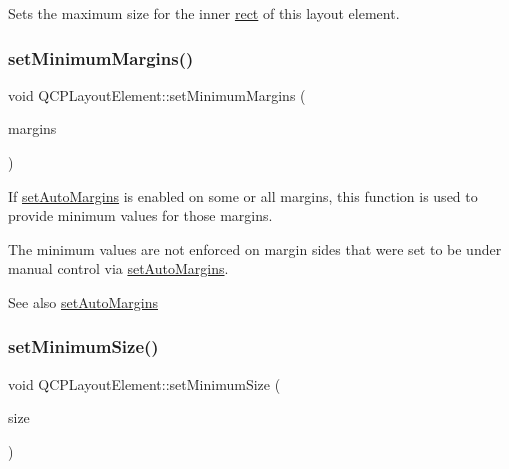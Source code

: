 Sets the maximum size for the inner \mbox{\hyperlink{class_q_c_p_layout_element_a208effccfe2cca4a0eaf9393e60f2dd4}{rect}} of this layout element. \mbox{\label{class_q_c_p_layout_element_a0a8a17abc16b7923159fcc7608f94673}} 
\subsubsection{\texorpdfstring{set\+Minimum\+Margins()}{setMinimumMargins()}}
{\footnotesize\ttfamily void Q\+C\+P\+Layout\+Element\+::set\+Minimum\+Margins (\begin{DoxyParamCaption}\item[{const Q\+Margins \&}]{margins }\end{DoxyParamCaption})}

If \mbox{\hyperlink{class_q_c_p_layout_element_accfda49994e3e6d51ed14504abf9d27d}{set\+Auto\+Margins}} is enabled on some or all margins, this function is used to provide minimum values for those margins.

The minimum values are not enforced on margin sides that were set to be under manual control via \mbox{\hyperlink{class_q_c_p_layout_element_accfda49994e3e6d51ed14504abf9d27d}{set\+Auto\+Margins}}.

\begin{DoxySeeAlso}{See also}
\mbox{\hyperlink{class_q_c_p_layout_element_accfda49994e3e6d51ed14504abf9d27d}{set\+Auto\+Margins}} 
\end{DoxySeeAlso}
\mbox{\label{class_q_c_p_layout_element_a5dd29a3c8bc88440c97c06b67be7886b}} 
\subsubsection{\texorpdfstring{set\+Minimum\+Size()}{setMinimumSize()}\hspace{0.1cm}{\footnotesize\ttfamily [1/2]}}
{\footnotesize\ttfamily void Q\+C\+P\+Layout\+Element\+::set\+Minimum\+Size (\begin{DoxyParamCaption}\item[{const Q\+Size \&}]{size }\end{DoxyParamCaption})}


